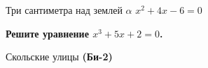 \documentclass{article}
\newcommand{\qeq}[1]{${#1}=0$}
\begin{document}
	Три сантиметра над землей
	$\alpha$
	\qeq{x^2+4x-6}
	
	\begin{large}
		\newcommand{\qz}[1]{\bf{Решите уравнение} \qeq{#1}.}
		\renewcommand{\alpha}{\bf{(Би-2)}}
		\qz{x^3+5x+2}
		
		Скольские улицы \alpha
	\end{large}
\end{document}
